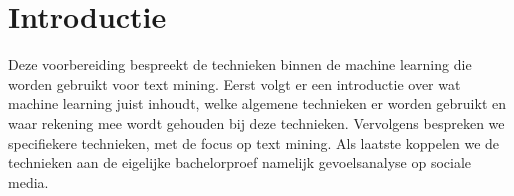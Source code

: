 \chapter{Introductie}\label{introductie}
Deze voorbereiding bespreekt de technieken binnen de machine learning die worden gebruikt voor text mining. Eerst volgt er een  introductie over wat machine learning juist inhoudt, welke algemene technieken er worden gebruikt en waar rekening mee wordt gehouden bij deze technieken. Vervolgens bespreken we specifiekere technieken, met de focus op text mining. Als laatste koppelen we de technieken aan de eigelijke bachelorproef namelijk gevoelsanalyse op sociale media.
